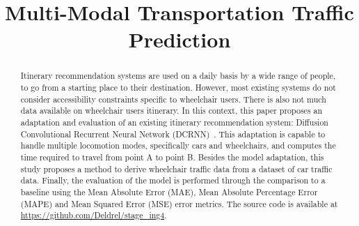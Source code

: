 \documentclass[conference]{IEEEtran}
\begin{document}



    \title{Multi-Modal Transportation Traffic Prediction}
    \author{}

    \maketitle

    \begin{abstract}
        Itinerary recommendation systems are used on a daily basis by a wide range of people, to go from a starting place to their destination.
        However, most existing systems do not consider accessibility constraints specific to wheelchair users.
        There is also not much data available on wheelchair users itinerary.
        In this context, this paper proposes an adaptation and evaluation of an existing itinerary recommendation system: Diffusion Convolutional Recurrent Neural Network (DCRNN)~\cite{DCRNN}.
        This adaptation is capable to handle multiple locomotion modes, specifically cars and wheelchairs, and computes the time required to travel from point A to point B.
        Besides the model adaptation, this study proposes a method to derive wheelchair traffic data from a dataset of car traffic data.
        Finally, the evaluation of the model is performed through the comparison to a baseline using the Mean Absolute Error (MAE), Mean Absolute Percentage Error (MAPE) and Mean Squared Error (MSE) error metrics.
        The source code is available at \url{https://github.com/Deldrel/stage_ing4}.
    \end{abstract}
\end{document}

